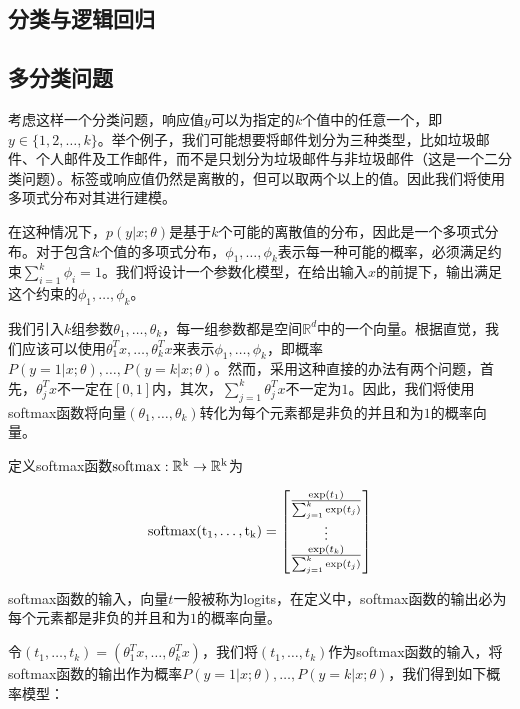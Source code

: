 \documentclass[letterpaper,11pt]{article}
\numberwithin{equation}{section}
\begin{document}
\begin{CJK}{UTF8}{gbsn}

  \section{分类与逻辑回归}

  \subsection{多分类问题}

  考虑这样一个分类问题，响应值$y$可以为指定的$k$个值中的任意一个，即$y\in\{1,2,\ldots,k\}$。举个例子，我们可能想要将邮件划分为三种类型，比如垃圾邮件、个人邮件及工作邮件，而不是只划分为垃圾邮件与非垃圾邮件（这是一个二分类问题）。标签或响应值仍然是离散的，但可以取两个以上的值。因此我们将使用多项式分布对其进行建模。

  在这种情况下，$p(y | x;\theta)$是基于$k$个可能的离散值的分布，因此是一个多项式分布。对于包含$k$个值的多项式分布，$\phi_1,\ldots,\phi_k$表示每一种可能的概率，必须满足约束$\sum^k_{i=1}\phi_i=1$。我们将设计一个参数化模型，在给出输入$x$的前提下，输出满足这个约束的$\phi_1,\ldots,\phi_k$。

  我们引入$k$组参数$\theta_1,\ldots,\theta_k$，每一组参数都是空间$\mathbb{R}^d$中的一个向量。根据直觉，我们应该可以使用$\theta_1^Tx,\ldots,\theta_k^Tx$来表示$\phi_1,\ldots,\phi_k$，即概率$P(y=1 | x;\theta),\ldots,P(y=k | x;\theta)$。然而，采用这种直接的办法有两个问题，首先，$\theta_j^Tx$不一定在$[0,1]$内，其次，$\sum^k_{j=1}\theta_j^Tx$不一定为$1$。因此，我们将使用softmax函数将向量$(\theta_1,\ldots,\theta_k)$转化为每个元素都是非负的并且和为$1$的概率向量。

  定义softmax函数$\rm{softmax}:\mathbb{R}^k \rightarrow \mathbb{R}^k$为

  \begin{equation}
    \rm{softmax}(t_1,\ldots,t_k)=
    \begin{bmatrix}
      \frac{{\rm{exp}} (t_1)}{\sum^k_{j=1}{\rm{exp}} (t_j)} \\
      \vdots \\
      \frac{{\rm{exp}} (t_k)}{\sum^k_{j=1}{\rm{exp}} (t_j)} \\
    \end{bmatrix}
  \end{equation}

  softmax函数的输入，向量$t$一般被称为logits，在定义中，softmax函数的输出必为每个元素都是非负的并且和为$1$的概率向量。

  令$(t_1,\ldots,t_k)=(\theta_1^Tx,\ldots,\theta_k^Tx)$，我们将$(t_1,\ldots,t_k)$作为softmax函数的输入，将softmax函数的输出作为概率$P(y=1 | x;\theta),\ldots,P(y=k | x;\theta)$，我们得到如下概率模型：


\end{CJK}
\end{document}
